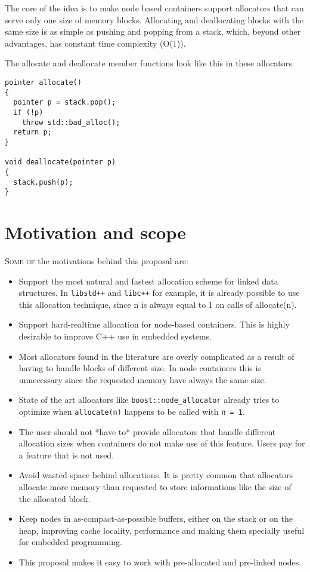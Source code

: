 \documentclass[11pt]{article}
\begin{document}
The core of the idea is to make node based containers
support allocators that can serve only one size of memory blocks.
Allocating and deallocating blocks with the same size is as
simple as pushing and popping from a stack, which, beyond other
advantages, has constant time complexity (O(1)).

The allocate and deallocate member functions look like this in
these allocators.

\begin{lstlisting}
pointer allocate()
{
  pointer p = stack.pop(); 
  if (!p)
    throw std::bad_alloc();
  return p; 
}

void deallocate(pointer p)
{
  stack.push(p);
}
\end{lstlisting}

\section{Motivation and scope}

\textsc{Some of} the motivations behind this proposal are:
\begin{itemize}

\item Support the most natural and fastest allocation scheme for
linked data structures. In \texttt{libstd++} and \texttt{libc++} for example, it
is already possible to use this allocation technique, since n is always equal
to 1 on calls of allocate(n).

\item Support hard-realtime allocation for node-based containers.
This is highly desirable to improve C++ use in embedded systems.

\item Most allocators found in the literature are overly complicated
as a result of having to handle blocks of different size. In node
containers this is unnecessary since the requested memory have always
the same size.

\item State of the art allocators like \texttt{boost::node\_allocator}
already tries to optimize when \texttt{allocate(n)} happens to be called with
\texttt{n = 1}. 

\item The user should not *have to* provide allocators that handle
different allocation sizes when containers do not make use of this
feature. Users pay for a feature that is not used.

\item Avoid wasted space behind allocations. It is pretty common that
allocators allocate more memory than requested to store informations
like the size of the allocated block.

\item Keep nodes in as-compact-as-possible buffers, either on the
stack or on the heap, improving cache locality, performance and making
them specially useful for embedded programming.

\item This proposal makes it easy to work with pre-allocated and
pre-linked nodes.

\end{itemize}
\end{document}
